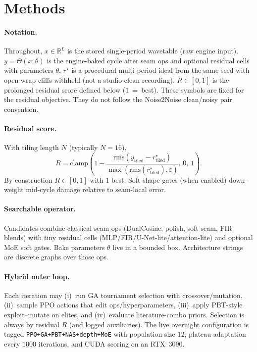 \section{Methods}
\label{sec:methods}

\paragraph{Notation.}
Throughout, $x\in\mathbb{R}^{L}$ is the stored single-period wavetable (raw engine input).
$y=\Theta(x;\theta)$ is the engine-baked cycle after seam ops and optional residual cells with parameters $\theta$.
$r^{\star}$ is a procedural multi-period ideal from the same seed with open-wrap cliffs withheld (not a studio-clean recording).
$R\in[0,1]$ is the prolonged residual score defined below ($1$~=~best).
These symbols are fixed for the residual objective. They do not follow the Noise2Noise clean/noisy pair convention.

\paragraph{Residual score.}
With tiling length $N$ (typically $N{=}16$),
\begin{equation}
R=\mathrm{clamp}\!\left(1-\frac{\mathrm{rms}(y_{\mathrm{tiled}}-r^{\star}_{\mathrm{tiled}})}{\max(\mathrm{rms}(r^{\star}_{\mathrm{tiled}}),\varepsilon)},\,0,\,1\right).
\end{equation}
By construction $R\in[0,1]$ with $1$ best. Soft shape gates (when enabled) down-weight mid-cycle damage relative to seam-local error.

\paragraph{Searchable operator.}
Candidates combine classical seam ops (DualCosine, polish, soft seam, FIR blends) with tiny residual cells (MLP/FIR/U-Net-lite/attention-lite) and optional MoE soft gates.
Bake parameters $\theta$ live in a bounded box. Architecture strings are discrete graphs over those ops.

\paragraph{Hybrid outer loop.}
Each iteration may (i)~run GA tournament selection with crossover/mutation, (ii)~sample PPO actions that edit ops/hyperparameters, (iii)~apply PBT-style exploit--mutate on elites, and (iv)~evaluate literature-combo priors.
Selection is always by residual $R$ (and logged auxiliaries).
The live overnight configuration is tagged \texttt{PPO+GA+PBT+NAS+depth+MoE} with population size $12$, plateau adaptation every $1000$ iterations, and CUDA scoring on an RTX~3090.
